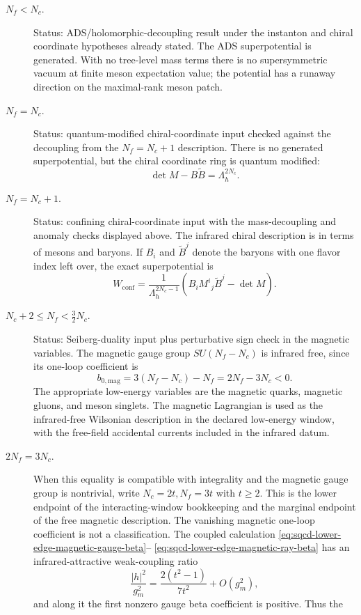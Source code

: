 \begin{description}
\item[\(N_f<N_c\).]
Status: ADS/holomorphic-decoupling result under the instanton and chiral
coordinate hypotheses already stated.  The ADS superpotential is generated.
With no tree-level mass terms there is no supersymmetric vacuum at finite
meson expectation value; the potential has a runaway direction on the
maximal-rank meson patch.
\item[\(N_f=N_c\).]
Status: quantum-modified chiral-coordinate input checked against the
decoupling from the \(N_f=N_c+1\) description.  There is no generated
superpotential, but the chiral coordinate ring is quantum modified:
\[
  \det M-B\widetilde B=\Lambda_h^{2N_c}.
\]
\item[\(N_f=N_c+1\).]
Status: confining chiral-coordinate input with the mass-decoupling and anomaly
checks displayed above.  The infrared chiral description is in terms of mesons
and baryons.  If \(B_i\) and \(\widetilde B^j\) denote the baryons with one
flavor index left over, the exact superpotential is
\begin{equation}
  W_{\mathrm{conf}}
  =
  \frac{1}{\Lambda_h^{2N_c-1}}
  \left(B_iM^i{}_j\widetilde B^j-\det M\right).
  \label{eq:sqcd-sconfining-superpotential}
\end{equation}
\item[\(N_c+2\leq N_f<\frac32N_c\).]
Status: Seiberg-duality input plus perturbative sign check in the magnetic
variables.  The magnetic gauge group \(SU(N_f-N_c)\) is infrared free, since
its one-loop coefficient is
\[
  b_{0,\mathrm{mag}}
  =
  3(N_f-N_c)-N_f
  =
  2N_f-3N_c<0 .
\]
The appropriate low-energy variables are the magnetic quarks, magnetic
gluons, and meson singlets.  The magnetic Lagrangian is used as the
infrared-free Wilsonian description in the declared low-energy window, with
the free-field accidental currents included in the infrared datum.
\item[\(2N_f=3N_c\).]
When this equality is compatible with integrality and the magnetic gauge group
is nontrivial, write \(N_c=2t,N_f=3t\) with \(t\ge2\).  This is the lower
endpoint of the interacting-window bookkeeping and the marginal endpoint of
the free magnetic description.  The vanishing magnetic one-loop coefficient
is not a classification.  The coupled calculation
\eqref{eq:sqcd-lower-edge-magnetic-gauge-beta}--
\eqref{eq:sqcd-lower-edge-magnetic-ray-beta} has an infrared-attractive
weak-coupling ratio
\[
  \frac{|h|^2}{g_m^2}
  =
  \frac{2(t^2-1)}{7t^2}+O(g_m^2),
\]
and along it the first nonzero gauge beta coefficient is positive.  Thus the

\end{description}
